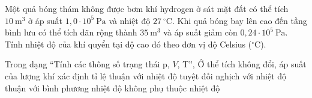 \begin{ex}
Một quả bóng thám không được bơm khí hydrogen ở sát mặt đất có thể tích $10\ \mathrm{m^3}$ ở áp suất $1,0 \cdot 10^5\ \mathrm{Pa}$ và nhiệt độ $27\ ^\circ\mathrm{C}$. Khi quả bóng bay lên cao đến tầng bình lưu có thể tích dãn rộng thành $35\ \mathrm{m^3}$ và áp suất giảm còn $0,24 \cdot 10^5\ \mathrm{Pa}$. Tính nhiệt độ của khí quyển tại độ cao đó theo đơn vị độ Celsius ($^\circ\mathrm{C}$).
\end{ex}

\begin{ex}
Trong dạng “Tính các thông số trạng thái p, $V$, T”, Ở thể tích không đổi, áp suất của lượng khí xác định tỉ lệ
\choice
{\True thuận với nhiệt độ tuyệt đối}
{nghịch với nhiệt độ}
{thuận với bình phương nhiệt độ}
{không phụ thuộc nhiệt độ}
\end{ex}

